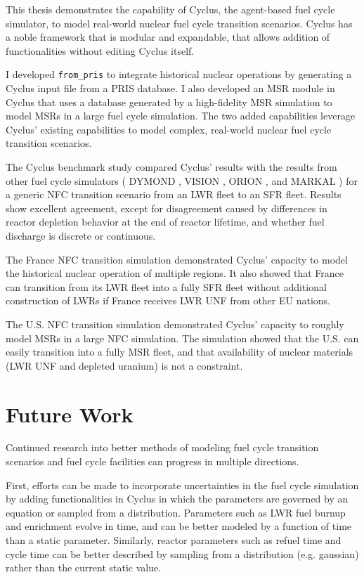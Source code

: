 This thesis demonstrates the capability of Cyclus, the agent-based
fuel cycle simulator, to model real-world nuclear fuel cycle
transition scenarios. Cyclus has a noble framework that is
modular and expandable, that allows addition of functionalities
without editing Cyclus itself.

I developed \texttt{from\_pris}
to integrate historical nuclear operations by generating
a Cyclus input file from a \gls{PRIS} database. I also
developed an \gls{MSR} module in Cyclus that uses a database
generated by a high-fidelity \gls{MSR} simulation to model
\glspl{MSR} in a large fuel cycle simulation. The two
added capabilities leverage Cyclus' existing capabilities
to model complex, real-world nuclear fuel cycle transition
scenarios.

The Cyclus benchmark study compared Cyclus' results with
the results from other fuel cycle simulators
(
DYMOND \cite{yacout_modeling_2005},
VISION \cite{jacobson_verifiable_2010},
ORION \cite{gregg_analysis_2012}, and
MARKAL \cite{shay_epa_2006}
) for a generic \gls{NFC} transition scenario from an
\gls{LWR} fleet to an \gls{SFR} fleet. Results show
excellent agreement, except for disagreement caused 
by differences in reactor depletion
behavior at the end of reactor lifetime, and
whether fuel discharge is discrete or continuous.

The France \gls{NFC} transition simulation demonstrated
Cyclus' capacity to model the historical nuclear operation
of multiple regions. It also showed that
France can transition from its \gls{LWR} fleet into a fully \gls{SFR} fleet
without additional construction of \glspl{LWR} if France receives
\gls{LWR} \gls{UNF} from other \gls{EU} nations.

The U.S. \gls{NFC} transition simulation demonstrated
Cyclus' capacity to roughly model \glspl{MSR} in
a large \gls{NFC} simulation. The simulation showed
that the U.S. can easily transition into a fully
\gls{MSR} fleet, and that availability of nuclear materials
(\gls{LWR} \gls{UNF} and depleted uranium) is not a constraint.



\section{Future Work}
Continued research into better methods of modeling fuel cycle
transition scenarios and fuel cycle facilities can progress
in multiple directions. 

First, efforts can be made to incorporate
uncertainties in the fuel cycle simulation by adding functionalities
in Cyclus in which the parameters are governed by an equation
or sampled from a distribution. Parameters such as \gls{LWR} fuel
burnup and enrichment evolve in time, and can be better modeled
by a function of time than a static parameter. Similarly, reactor parameters
such as refuel time and cycle time can be better described by sampling
from a distribution (e.g. gaussian) rather than the current static
value.

